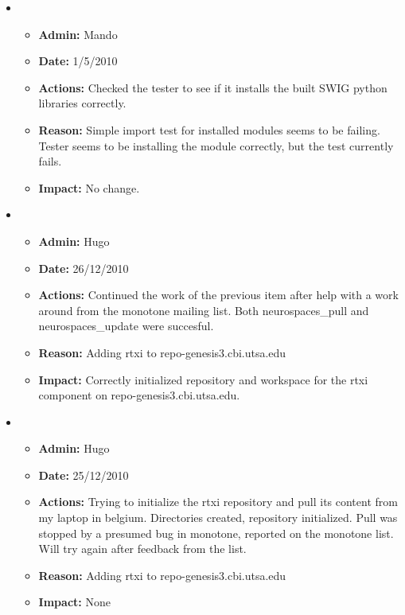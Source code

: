 \documentclass[12pt]{article}
\begin{document}
\begin{itemize}
\item
\begin{itemize}
\item[] {\bf Admin:} Mando
\item[] {\bf Date:} 1/5/2010 
\item[] {\bf Actions:} Checked the tester to see if it installs the built
SWIG python libraries correctly.
\item[] {\bf Reason:} Simple import test for installed modules seems to be failing. Tester seems to be installing the module correctly, but the test currently fails.
\item[] {\bf Impact:} No change.
\end{itemize}

\item
\begin{itemize}
\item[] {\bf Admin:} Hugo
\item[] {\bf Date:} 26/12/2010 
\item[] {\bf Actions:} Continued the work of the previous item after
  help with a work around from the monotone mailing list.  Both
  neurospaces\_pull and neurospaces\_update were succesful.
\item[] {\bf Reason:} Adding rtxi to repo-genesis3.cbi.utsa.edu
\item[] {\bf Impact:} Correctly initialized repository and workspace
  for the rtxi component on repo-genesis3.cbi.utsa.edu.
\end{itemize}


\item
\begin{itemize}
\item[] {\bf Admin:} Hugo
\item[] {\bf Date:} 25/12/2010 
\item[] {\bf Actions:} Trying to initialize the rtxi repository and
  pull its content from my laptop in belgium.  Directories created,
  repository initialized.  Pull was stopped by a presumed bug in
  monotone, reported on the monotone list.  Will try again after
  feedback from the list.
\item[] {\bf Reason:} Adding rtxi to repo-genesis3.cbi.utsa.edu
\item[] {\bf Impact:} None
\end{itemize}



\end{itemize}
\end{document}
